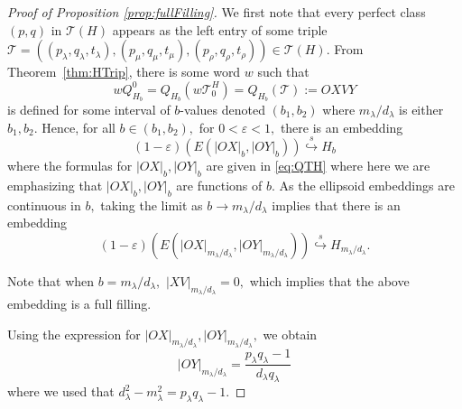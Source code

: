 \documentclass[11pt, reqno]{amsart}
\theoremstyle{remark}
\numberwithin{equation}{subsection}
\numberwithin{figure}{section}
\theoremstyle{customremark}
\newcommand{\Tt}{\mathcal{T}}
\newcommand{\la}{{\lambda}}
\newcommand{\eps}{\varepsilon}
\newcommand{\T}{\mathcal{T}}
\newcommand{\sembeds}{\stackrel{s}{\hookrightarrow}}
\begin{document}
\begin{proof}[Proof of Proposition \ref{prop:fullFilling}]
We first note that every perfect class $(p,q)$ in $\T(H)$ appears as the left entry of some triple $\Tt=((p_\la,q_\la,t_\la),(p_\mu,q_\mu,t_\mu),(p_\rho,q_\rho,t_\rho)) \in \T(H)$. From Theorem~\ref{thm:HTrip}, there is some word $w$ such that \[wQ_{H_b}^0=Q_{H_b}(w\Tt_0^H)=Q_{H_b}(\Tt):=OXVY\] is defined for some interval of $b$-values denoted $(b_1,b_2)$ where $m_\la/d_\la$ is either $b_1,b_2.$ Hence, for all $b \in (b_1,b_2),$
for $0 < \eps <1,$ there is an embedding 
\[ (1-\eps)(E(|OX|_b,|OY|_b)) \sembeds H_b\]
where the formulas for $|OX|_b,|OY|_b$ are given in \eqref{eq:QTH} where here we are emphasizing that $|OX|_b,|OY|_b$ are functions of $b$. As the ellipsoid embeddings are continuous in $b,$ taking the limit as $b \to m_\la/d_\la$ implies that there is an embedding
\[ (1-\eps)(E(|OX|_{m_\la/d_\la},|OY|_{m_\la/d_\la})) \sembeds H_{m_\la/d_\la}.\]

Note that when $b=m_\la/d_\la,$ $|XV|_{m_\la/d_\la}=0,$ which implies that the above embedding is a full filling. 

Using the expression for $|OX|_{m_\la/d_\la},|OY|_{m_\la/d_\la},$ we obtain 
\[ |OY|_{m_\la/d_\la}=\frac{p_\la q_\la-1}{d_\la q_\la}\]
where we used that $d_\la^2-m_\la^2=p_\la q_\la-1.$


\end{proof}
\end{document}
